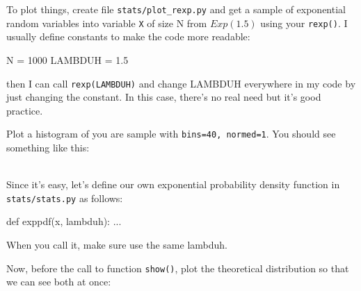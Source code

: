 \begin{fullwidth}
\step To plot things, create file {\tt stats/plot\_rexp.py} and get a sample of exponential random variables into variable {\tt X} of size N from $Exp(1.5)$ using your {\tt rexp()}. I usually define constants to make the code more readable:

\begin{pyverbatim}
N = 1000
LAMBDUH = 1.5
\end{pyverbatim}

\noindent then I can call {\tt rexp(LAMBDUH)} and change LAMBDUH everywhere in my code by just changing the constant. In this case, there's no real need but it's good practice.

\step  Plot a histogram of you are sample with {\tt bins=40, normed=1}.  You should see something like this:


\\

\step Since it's easy, let's define our own exponential probability density function in {\tt stats/stats.py} as follows:

\begin{pyverbatim}
def exppdf(x, lambduh):
    ...
\end{pyverbatim}

\noindent When you call it, make sure use the same lambduh.

\step Now, before the call to function {\tt show()}, plot the theoretical distribution so that we can see both at once:


\end{fullwidth}
